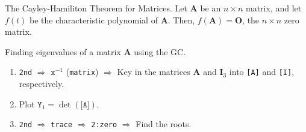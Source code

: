 \documentclass[../Notes.tex]{subfiles}
\begin{document}
\begin{corollary}{The Cayley-Hamiliton Theorem for Matrices.}{}
    Let \(\mathbf{A}\) be an \(n\times n\) matrix, and let \(f(t)\) be the characteristic polynomial of \(\mathbf{A}\). Then, \(f(\mathbf{A})=\mathbf{O}\), the \(n\times n\) zero matrix.  
\end{corollary}
\hypertarget{characteristic-polynomial-roots}{}
\begin{GCSkills}{}
    Finding eigenvalues of a matrix \(\mathbf{A}\) using the GC.
    \begin{enumerate}
        \item \texttt{2nd} \(\Longrightarrow\) \(\texttt{x}^{-1}\) (\texttt{matrix}) \(\Longrightarrow\) Key in the matrices \(\mathbf{A}\) and \(\mathbf{I}_3\) into \texttt{[A]} and \texttt{[I]}, respectively. 
        \item Plot \(\texttt{Y}_1=\det{(\texttt{[A]})}\).
        \item \texttt{2nd} \(\Longrightarrow\) \texttt{trace} \(\Longrightarrow\) \texttt{2:zero} \(\Longrightarrow\) Find the roots.
    \end{enumerate}
\end{GCSkills}
\end{document}
